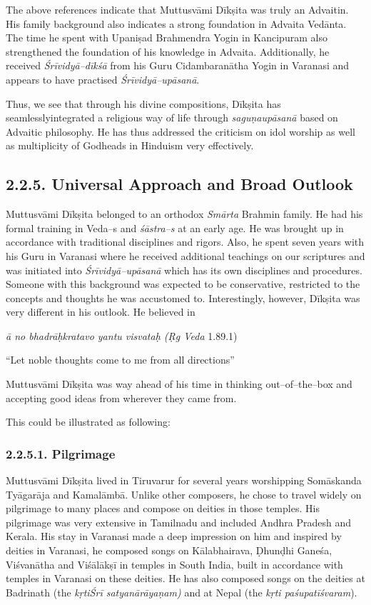 The above references indicate that Muttusvāmi Dīkṣita was truly an Advaitin. His family background also indicates a strong foundation in Advaita Vedānta. The time he spent with Upaniṣad Brahmendra Yogin in Kancipuram also strengthened the foundation of his knowledge in Advaita. Additionally, he received \textit{Śrīvidyā–dīkśā} from his Guru Cidambaranātha Yogin in Varanasi and appears to have practised \textit{Śrīvidyā–upāsanā}.

Thus, we see that through his divine compositions, Dīkṣita has seamlesslyintegrated a religious way of life through \textit{saguṇaupāsanā} based on Advaitic philosophy. He has thus addressed the criticism on idol worship as well as multiplicity of Godheads in Hinduism very effectively.


\subsection*{2.2.5. Universal Approach and Broad Outlook}

Muttusvāmi Dīkṣita belonged to an orthodox \textit{Smārta} Brahmin family. He had his formal training in Veda–s and \textit{śāstra–s} at an early age. He was brought up in accordance with traditional disciplines and rigors. Also, he spent seven years with his Guru in Varanasi where he received additional teachings on our scriptures and was initiated into \textit{Śrīvidyā–upāsanā} which has its own disciplines and procedures. Someone with this background was expected to be conservative, restricted to the concepts and thoughts he was accustomed to. Interestingly, however, Dīkṣita was very different in his outlook. He believed in

\textit{ā no bhadrāḥkratavo yantu visvataḥ (Ṛg Veda} 1.89.1)

“Let noble thoughts come to me from all directions”

Muttusvāmi Dīkṣita was way ahead of his time in thinking out–of–the–box and accepting good ideas from wherever they came from.

This could be illustrated as following:

\subsubsection*{2.2.5.1. Pilgrimage}

Muttusvāmi Dīkṣita lived in Tiruvarur for several years worshipping Somāskanda Tyāgarāja and Kamalāmbā. Unlike other composers, he chose to travel widely on pilgrimage to many places and compose on deities in those temples. His pilgrimage was very extensive in Tamilnadu and included Andhra Pradesh and Kerala. His stay in Varanasi made a deep impression on him and inspired by deities in Varanasi, he composed songs on Kālabhairava, Ḍhunḍhi Ganeśa, Viśvanātha and Viśālākṣī in temples in South India, built in accordance with temples in Varanasi on these deities. He has also composed songs on the deities at Badrinath (the \textit{kṛtiŚrī satyanārāyaṇam)} and at Nepal (the\textit{ kṛti paśupatīśvaram}).

